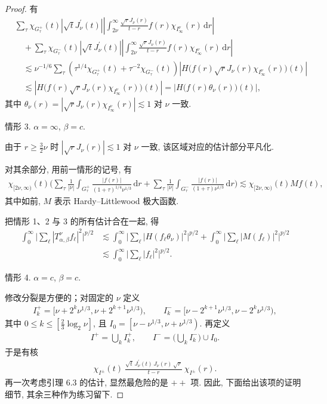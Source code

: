 \begin{proof}
有
\begin{align*}
  &\sum_{\tau}\chi_{G^{+}_{\tau}}(t)\left|\sqrt{t}J^{\prime}_{\nu}(t)\right|
   \left|\int_{2\nu}^{\infty}\frac{\sqrt{r}J_{\nu}(r)}{t-r}f(r)\chi_{I^{\nu}_{\infty}}(r)\,\mathrm{d}r\right|\\
  &\quad+\sum_{\tau}\chi_{G^{-}_{\tau}}(t)\left|\sqrt{t}J^{\prime}_{\nu}(t)\right|
   \left|\int_{2\nu}^{\infty}\frac{\sqrt{r}J_{\nu}(r)}{t-r}f(r)\chi_{I^{\nu}_{\infty}}(r)\,\mathrm{d}r\right|\\
  &\quad\lesssim\nu^{-1/6}\sum_{\tau}(\tau^{1/4}\chi_{G^{+}_{\tau}}(t)+\tau^{-2}\chi_{G^{-}_{\tau}}(t))
   \left|H\bigl(f(r)\sqrt{r}J_{\nu}(r)\chi_{I^{\nu}_{\infty}}(r)\bigr)(t)\right|\\
  &\quad\lesssim\left|H\bigl(f(r)\sqrt{r}J_{\nu}(r)\chi_{I^{\nu}_{\infty}}(r)\bigr)(t)\right|
  =\left|H\bigl(f(r)\theta_{\nu}(r)\bigr)(t)\right|,
\end{align*}
其中 $\theta_\nu(r) = \left|\sqrt{r}J_\nu(r)\chi_{I_\infty^\nu}(r)\right| \lesssim 1$ 对 $\nu$ 一致.

情形 3. $\alpha = \infty$, $\beta = c$.

由于 $r \geq \frac{3}{2}\nu$ 时 $|\sqrt{r}J_{\nu}(r)| \lesssim 1$ 对 $\nu$ 一致, 该区域对应的估计部分平凡化.

对其余部分, 用前一情形的记号, 有
\begin{align*}
  \chi_{[2\nu,\infty)}(t)\Big(\sum_{\tau}\frac{1}{|\nu|}\int_{G^{+}_{\tau}}\frac{|f(r)|}{(1+\tau)^{1/4}\nu^{1/3}}\,\mathrm{d}r
  +\sum_{\tau}\frac{1}{|\nu|}\int_{G^{-}_{\tau}}\frac{|f(r)|}{(1+\tau)\nu^{1/3}}\,\mathrm{d}r\Big)
  \lesssim\chi_{[2\nu,\infty)}(t)Mf(t),
\end{align*}
其中如前, $M$ 表示 Hardy--Littlewood 极大函数.

把情形 1、2 与 3 的所有估计合在一起, 得
\begin{align*}
  \int_{0}^{\infty}\Big|\sum_{\ell}|T^{\nu}_{\alpha,\beta}f_{\ell}|^{2}\Big|^{p/2}
  &\lesssim\int_{0}^{\infty}\Big|\sum_{\ell}|H(f_{\ell}\theta_{\nu})|^{2}\Big|^{p/2}
  +\int_{0}^{\infty}\Big|\sum_{\ell}|M(f_{\ell})|^{2}\Big|^{p/2}\\
  &\lesssim\int_{0}^{\infty}\Big|\sum_{\ell}|f_{\ell}|^{2}\Big|^{p/2}.
\end{align*}

情形 4. $\alpha = c$, $\beta = c$.

修改分裂是方便的；对固定的 $\nu$ 定义
\begin{align*}
  I_{k}^{+}=[\nu+2^{k}\nu^{1/3},\nu+2^{k+1}\nu^{1/3}),\qquad
  I_{k}^{-}=[\nu-2^{k+1}\nu^{1/3},\nu-2^{k}\nu^{1/3}),
\end{align*}
其中 $0 \leq k \leq \left[\frac{2}{3}\log_2 \nu\right]$, 且 $I_0 = \left[\nu - \nu^{1/3}, \nu + \nu^{1/3}\right)$. 再定义
\begin{align*}
  I^{+}=\bigcup_{k}I_{k}^{+},\qquad
  I^{-}=\Big(\bigcup_{k}I_{k}^{-}\Big)\cup I_{0}.
\end{align*}
于是有核
\begin{align*}
  \chi_{I^{\pm}}(t)\ \frac{\sqrt{t}\,J_{\nu}^{\prime}(t)\,J_{\nu}(r)\,\sqrt{r}}{t-r}\ \chi_{I^{\pm}}(r).
\end{align*}
再一次考虑引理 6.3 的估计, 显然最危险的是 $++$ 项. 因此, 下面给出该项的证明细节, 其余三种作为练习留下.


\end{proof}
